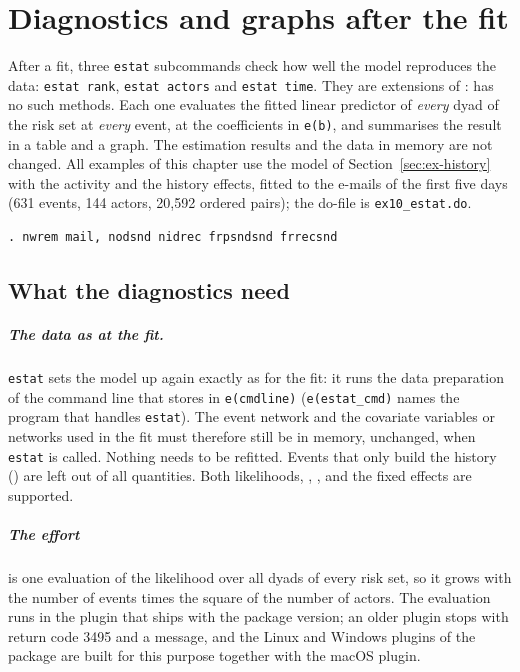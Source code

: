 \chapter{Diagnostics and graphs after the fit}\label{ch:estat}

After a fit, three \texttt{estat} subcommands check how well the model reproduces the data: \texttt{estat rank}, \texttt{estat actors} and \texttt{estat time}. They are extensions of \nwrem{}: \relevent{} has no such methods. Each one evaluates the fitted linear predictor of \emph{every} dyad of the risk set at \emph{every} event, at the coefficients in \texttt{e(b)}, and summarises the result in a table and a graph. The estimation results and the data in memory are not changed. All examples of this chapter use the model of Section~\ref{sec:ex-history} with the activity and the history effects, fitted to the e-mails of the first five days (631 events, 144 actors, 20,592 ordered pairs); the do-file is \texttt{ex10\_estat.do}.
\begin{lstlisting}
. nwrem mail, nodsnd nidrec frpsndsnd frrecsnd
\end{lstlisting}

\section{What the diagnostics need}\label{sec:estat-need}

\paragraph{The data as at the fit.} \texttt{estat} sets the model up again exactly as for the fit: it runs the data preparation of the command line that \nwrem{} stores in \texttt{e(cmdline)} (\texttt{e(estat\_cmd)} names the program that handles \texttt{estat}). The event network and the covariate variables or networks used in the fit must therefore still be in memory, unchanged, when \texttt{estat} is called. Nothing needs to be refitted. Events that only build the history () are left out of all quantities. Both likelihoods, , ,  and the fixed effects are supported.

\paragraph{The effort} is one evaluation of the likelihood over all dyads of every risk set, so it grows with the number of events times the square of the number of actors. The evaluation runs in the plugin that ships with the package version; an older plugin stops with return code 3495 and a message, and the Linux and Windows plugins of the package are built for this purpose together with the macOS plugin.

